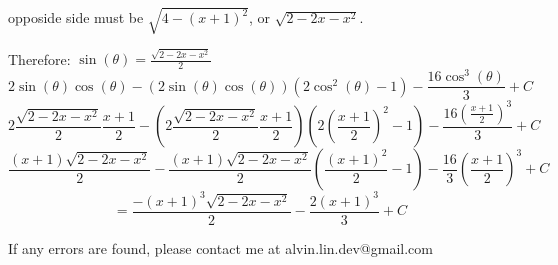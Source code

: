 \documentclass[letterpaper, 12pt]{article}
\begin{document}
opposide side must be \( \sqrt{4-(x+1)^{2}} \), or \( \sqrt{2-2x-x^{2}} \).
\begin{center}
\end{center}
Therefore: \( \sin(\theta) = \frac{\sqrt{2-2x-x^{2}}}{2} \)
\[ 2\sin(\theta)\cos(\theta)-
   (2\sin(\theta)\cos(\theta))(2\cos^{2}(\theta)-1)-
   \frac{16\cos^{3}(\theta)}{3}+C \]
\[ 2\frac{\sqrt{2-2x-x^{2}}}{2}\frac{x+1}{2}-
   (2\frac{\sqrt{2-2x-x^{2}}}{2}\frac{x+1}{2})(2(\frac{x+1}{2})^{2}-1)-
   \frac{16(\frac{x+1}{2})^{3}}{3}+C \]
\[ \frac{(x+1)\sqrt{2-2x-x^{2}}}{2}-
   \frac{(x+1)\sqrt{2-2x-x^{2}}}{2}(\frac{(x+1)^{2}}{2}-1)-
   \frac{16}{3}(\frac{x+1}{2})^{3}+C \]
\[ = \frac{-(x+1)^{3}\sqrt{2-2x-x^{2}}}{2}-\frac{2(x+1)^{3}}{3}+C \]

\begin{center}
  If any errors are found, please contact me at alvin.lin.dev@gmail.com
\end{center}
\end{document}
